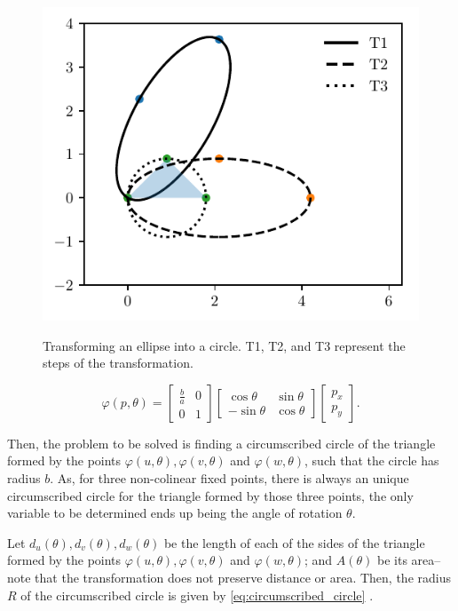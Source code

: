 \begin{figure}[H]
	\centering
	\caption{Transforming an ellipse into a circle. T1, T2, and T3 represent the steps of the transformation.}
	\includegraphics{tex/figures/scripts/circumscribed-circle}
	\fautor
	\label{fig:circumscribed-circle}
\end{figure}
\begin{equation}\label{eq:trpnts}
\varphi(p, \theta)=\left[\begin{array}{cc}
\frac{b}{a}&0\\
0&1
\end{array}\right]
\left[\begin{array}{cc}
\cos{\theta}&\sin{\theta}\\
-\sin{\theta}&\cos{\theta}
\end{array}\right]\left[\begin{array}{c}
p_x\\
p_y
\end{array}\right].
\end{equation}

Then, the problem to be solved is finding a circumscribed circle of the triangle formed by the points $\varphi(u, \theta), \varphi(v, \theta)$ and $\varphi(w, \theta)$, such that the circle has radius $b$. As, for three non-colinear fixed points, there is always an unique circumscribed circle for the triangle formed by those three points, the only variable to be determined ends up being the angle of rotation $\theta$.

Let $d_u(\theta), d_v(\theta), d_w(\theta)$ be the length of each of the sides of the triangle formed by the points $\varphi(u, \theta), \varphi(v, \theta)$ and $\varphi(w, \theta)$; and $A(\theta)$ be its area--note that the transformation does not preserve distance or area. Then, the radius $R$ of the circumscribed circle is given by \autoref{eq:circumscribed_circle} \cite[p.~189]{johnson1960}.

